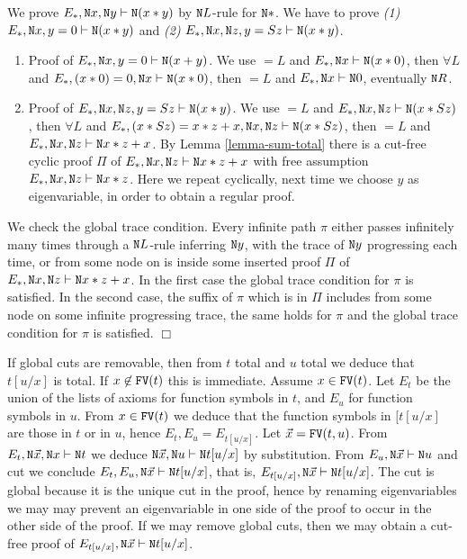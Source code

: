 \documentclass[a4paper,12pt]{article}
\newenvironment{proof}[1][Proof]{\begin{trivlist}
\item[\hskip \labelsep {\bfseries #1}]}{\end{trivlist}}
\newcommand{\Nat}               { {\tt N}  }
\newcommand{\FV}              { {\tt FV} }
\newcommand{\eqL}     {= \! \!  \!  L}
\begin{document}
\begin{proof}
We prove $E_*, \Nat x, \Nat y \vdash \Nat (x*y)$ by $\Nat L$-rule for $\Nat *$. We have to prove \emph{(1)} $E_*, \Nat x, y=0 \vdash \Nat (x*y)$ and \emph{(2)} $E_*, \Nat x, \Nat z, y=Sz \vdash \Nat (x*y)$. 
\begin{enumerate}
\item
Proof of $E_*, \Nat x, y=0 \vdash \Nat (x+y)$. We use $\eqL$ and $E_*, \Nat x \vdash \Nat (x*0)$, then $\forall L$ and $E_*,  (x*0)=0, \Nat x \vdash \Nat (x*0)$, then $\eqL$ and  $E_*, \Nat x \vdash \Nat 0$, eventually $\Nat R$.
\item
Proof of $E_*, \Nat x, \Nat z, y=Sz \vdash \Nat (x*y)$. We use $\eqL$ and $E_*, \Nat x, \Nat z \vdash \Nat (x*Sz)$, then $\forall L$ and $E_*,  (x*Sz)=x*z+x, \Nat x, \Nat z \vdash \Nat (x*Sz)$, then $\eqL$ and  $E_*, \Nat x, \Nat z \vdash \Nat x*z+x$. By Lemma \ref{lemma-sum-total} there is a cut-free cyclic proof $\Pi$ of $E_*, \Nat x, \Nat z \vdash \Nat x*z+x$ with free assumption $E_*, \Nat x, \Nat z \vdash \Nat x*z$. Here we repeat cyclically, next time we choose $y$ as eigenvariable, in order to obtain a regular proof.
 \end{enumerate}
We check the global  trace condition. Every infinite path $\pi$ either passes infinitely many times through a $\Nat L$-rule inferring $\Nat y$, with the trace of $\Nat y$ progressing each time, or from some node on is inside some inserted proof $\Pi$ of $E_*, \Nat x, \Nat z \vdash \Nat x*z+x$. In the first case the global trace condition for $\pi$ is satisfied. In the second case, the suffix of $\pi$ which is in $\Pi$ includes from some node on some infinite progressing trace, the same holds for $\pi$ and the global trace condition for $\pi$ is satisfied.
$\Box$ \end{proof}

If global cuts are removable, then from $t$ total and $u$ total we deduce that $t[u/x]$ is total. If $x \not \in \FV(t)$ this is immediate. Assume $x \in \FV(t)$. Let $E_t$ be the union of the lists of axioms for function symbols in $t$, and $E_u$ for function symbols in $u$. From $x \in \FV(t)$ we deduce that the function symbols in $[t[u/x]$ are those in $t$ or in $u$, hence $E_t, E_u = E_{t[u/x]}$. Let $\vec{x} = \FV(t,u)$. From $E_t, \Nat \vec{x}, \Nat x \vdash \Nat t$ we deduce $\Nat \vec{x}, \Nat u \vdash \Nat t[u/x]$ by substitution. From $E_u, \Nat \vec{x} \vdash \Nat u$ and cut we conclude $E_t, E_u, \Nat \vec{x} \vdash \Nat t[u/x]$, that is, $E_{t[u/x]}, \Nat \vec{x} \vdash \Nat t[u/x]$. The cut is global because it is the unique cut in the proof, hence by renaming eigenvariables we may may prevent an eigenvariable in one side of the proof to occur in the other side of the proof. If we may remove global cuts, then we may obtain a cut-free proof of $E_{t[u/x]}, \Nat \vec{x} \vdash \Nat t[u/x]$. 
\end{document}
